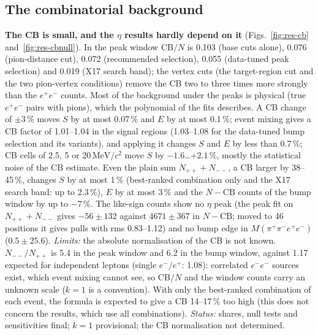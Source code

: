 \documentclass[11pt,a4paper]{article}
\newcommand{\ee}{\ensuremath{e^{+}e^{-}}\xspace}
\newcommand{\Mfour}{\ensuremath{M(\pi^{+}\pi^{-}e^{+}e^{-})}\xspace}
\newcommand{\MeVcc}{\ensuremath{\mathrm{MeV}/c^{2}}\xspace}
\begin{document}
\subsection{The combinatorial background}
\label{sec:cb}
\textbf{The CB is small, and the $\eta$ results hardly depend on it} (Figs.~\ref{fig:res-cb} and~\ref{fig:res-cbnull}). In the peak window
CB$/N$ is 0.103 (base cuts alone), 0.076 (pion-distance cut), 0.072 (recommended selection), 0.055 (data-tuned peak selection) and 0.019
(X17 search band); the vertex cuts (the target-region cut and the two pion-vertex conditions) remove the CB two to three times more
strongly than the \ee counts. Most of the background under the peaks is physical (true \ee pairs with pions), which the polynomial of the
fits describes. A CB change of $\pm3$\,\% moves $S$ by at most 0.07\,\% and $E$ by at most 0.1\,\%; event mixing gives a CB factor of
1.01--1.04 in the signal regions (1.03--1.08 for the data-tuned bump selection and its variants), and applying it changes $S$ and $E$ by less
than 0.7\,\%; CB cells of 2.5, 5 or 20\,\MeVcc move $S$ by $-1.6$\dots$+2.1$\,\%, mostly the statistical noise of the CB estimate. Even the
plain sum $N_{++}+N_{--}$, a CB larger by 38--45\,\%, changes $S$ by at most 1\,\% (best-ranked combination only and the X17 search band:
up to 2.3\,\%), $E$ by at most 3\,\% and the $N-\mathrm{CB}$ counts of the bump window by up to $-7$\,\%. The like-sign counts show no
$\eta$ peak (the peak fit on $N_{++}+N_{--}$ gives $-56\pm132$ against $4671\pm367$ in $N-\mathrm{CB}$; moved to 46 positions it gives
pulls with rms 0.83--1.12) and no bump edge in \Mfour ($0.5\pm25.6$). \emph{Limits:} the absolute normalisation of the CB is not known.
$N_{--}/N_{++}$ is 5.4 in the peak window and 6.2 in the bump window, against 1.17 expected for independent leptons (single $e^-/e^+$:
1.08): correlated $e^-e^-$ sources exist, which event mixing cannot see, so CB$/N$ and the window counts carry an unknown scale ($k=1$ is
a convention). With only the best-ranked combination of each event, the formula is expected to give a CB 14--17\,\% too high (this does
not concern the results, which use all combinations). \emph{Status:} shares, null tests and sensitivities final; $k=1$ provisional; the CB
normalisation not determined.
\end{document}
